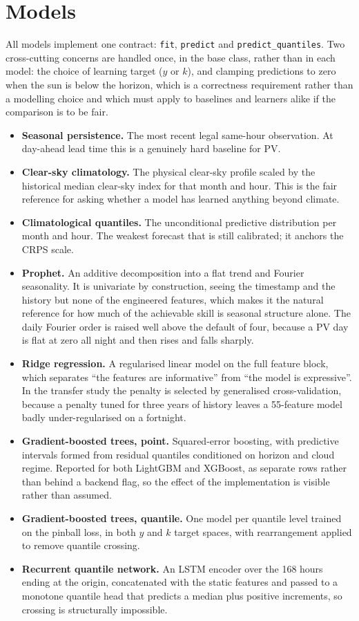 \documentclass[11pt,a4paper,oneside]{report}
\begin{document}
\section{Models}

All models implement one contract: \texttt{fit}, \texttt{predict} and \texttt{predict\_quantiles}. Two cross-cutting concerns are handled once, in the base class, rather than in each model: the choice of learning target ($y$ or $k$), and clamping predictions to zero when the sun is below the horizon, which is a correctness requirement rather than a modelling choice and which must apply to baselines and learners alike if the comparison is to be fair.

\begin{itemize}
\item \textbf{Seasonal persistence.} The most recent legal same-hour observation. At day-ahead lead time this is a genuinely hard baseline for PV.
\item \textbf{Clear-sky climatology.} The physical clear-sky profile scaled by the historical median clear-sky index for that month and hour. This is the fair reference for asking whether a model has learned anything beyond climate.
\item \textbf{Climatological quantiles.} The unconditional predictive distribution per month and hour. The weakest forecast that is still calibrated; it anchors the CRPS scale.
\item \textbf{Prophet.} An additive decomposition into a flat trend and Fourier seasonality. It is univariate by construction, seeing the timestamp and the history but none of the engineered features, which makes it the natural reference for how much of the achievable skill is seasonal structure alone. The daily Fourier order is raised well above the default of four, because a PV day is flat at zero all night and then rises and falls sharply.
\item \textbf{Ridge regression.} A regularised linear model on the full feature block, which separates ``the features are informative'' from ``the model is expressive''. In the transfer study the penalty is selected by generalised cross-validation, because a penalty tuned for three years of history leaves a 55-feature model badly under-regularised on a fortnight.
\item \textbf{Gradient-boosted trees, point.} Squared-error boosting, with predictive intervals formed from residual quantiles conditioned on horizon and cloud regime. Reported for both LightGBM and XGBoost, as separate rows rather than behind a backend flag, so the effect of the implementation is visible rather than assumed.
\item \textbf{Gradient-boosted trees, quantile.} One model per quantile level trained on the pinball loss, in both $y$ and $k$ target spaces, with rearrangement applied to remove quantile crossing.
\item \textbf{Recurrent quantile network.} An LSTM encoder over the 168 hours ending at the origin, concatenated with the static features and passed to a monotone quantile head that predicts a median plus positive increments, so crossing is structurally impossible.
\end{itemize}
\end{document}

